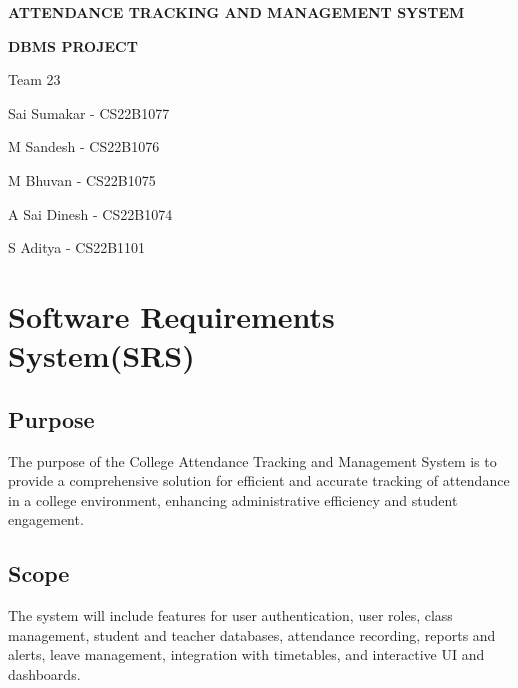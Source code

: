 \documentclass{article}
\begin{document}
\begin{titlepage}
    \centering
    \vspace*{5cm}
    {\Huge\bfseries ATTENDANCE TRACKING AND MANAGEMENT SYSTEM\par}
    \vspace{5cm}
    {\LARGE\bfseries DBMS PROJECT\par}
    \vspace{3cm}
    {\LARGE Team 23\par}
    \vspace{2cm}
    {\Large Sai Sumakar - CS22B1077\par}
    \vspace{0.2cm}
    {\Large M Sandesh - CS22B1076\par}
    \vspace{0.2cm}
    {\Large M Bhuvan - CS22B1075\par}
    \vspace{0.2cm}
    {\Large A Sai Dinesh - CS22B1074\par}
    \vspace{0.2cm}
    {\Large S Aditya - CS22B1101\par}
\end{titlepage}

\newpage

\section*{\huge{Software Requirements System(SRS)}}

\subsection*{\Large{Purpose}}
\begin{large}
The purpose of the College Attendance Tracking and Management System is to provide a comprehensive solution for efficient and accurate tracking of attendance in a college environment, enhancing administrative efficiency and student engagement.
\end{large}

\subsection*{\Large{Scope}}
\begin{large}
The system will include features for user authentication, user roles, class management, student and teacher databases, attendance recording, reports and alerts, leave management, integration with timetables, and interactive UI and dashboards.
\end{large}
\end{document}
